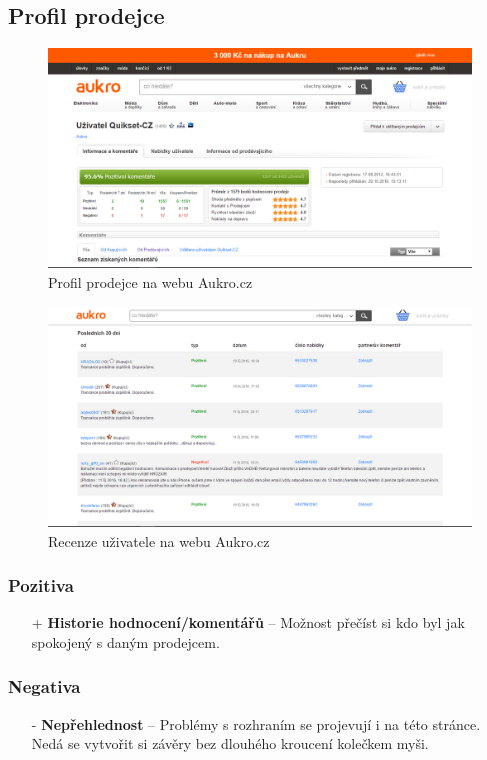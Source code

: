 \newpage
\subsection{Profil prodejce}
\begin{figure}[h]
    \centering
    \includegraphics[width=1.0\textwidth]{media/aukro/profile.png}
    \caption{Profil prodejce na webu Aukro.cz}
    \label{fig:aukro:profile}
\end{figure}
\begin{figure}[h]
    \centering
    \includegraphics[width=1.0\textwidth]{media/aukro/profile2.png}
    \caption{Recenze uživatele na webu Aukro.cz}
    \label{fig:aukro:profile2}
\end{figure}
\subsubsection*{Pozitiva}
\begin{itemize}
    \item[+] \textbf{Historie hodnocení/komentářů} -- Možnost přečíst si kdo byl jak spokojený s daným prodejcem.
\end{itemize}
\subsubsection*{Negativa}
\begin{itemize}
    \item[-] \textbf{Nepřehlednost} -- Problémy s rozhraním se projevují i na této stránce. Nedá se vytvořit si závěry bez dlouhého kroucení kolečkem myši.
\end{itemize}


